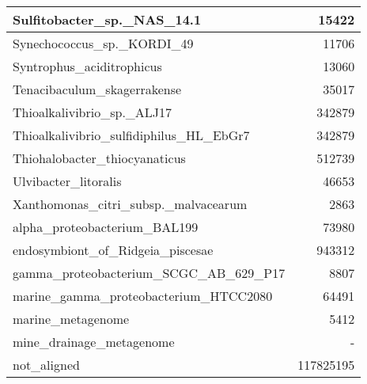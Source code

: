 \documentclass[12pt,a4paper]{article}
\begin{document}
\begin{table}[ht]
\begin{center}
\begin{tabular}{|l*{1}{|r}|}
Sulfitobacter\_sp.\_NAS\_14.1 & 15422 \\ \hline
Synechococcus\_sp.\_KORDI\_49 & 11706 \\ \hline
Syntrophus\_aciditrophicus & 13060 \\ \hline
Tenacibaculum\_skagerrakense & 35017 \\ \hline
Thioalkalivibrio\_sp.\_ALJ17 & 342879 \\ \hline
Thioalkalivibrio\_sulfidiphilus\_HL\_EbGr7 & 342879 \\ \hline
Thiohalobacter\_thiocyanaticus & 512739 \\ \hline
Ulvibacter\_litoralis & 46653 \\ \hline
Xanthomonas\_citri\_subsp.\_malvacearum & 2863 \\ \hline
alpha\_proteobacterium\_BAL199 & 73980 \\ \hline
endosymbiont\_of\_Ridgeia\_piscesae & 943312 \\ \hline
gamma\_proteobacterium\_SCGC\_AB\_629\_P17 & 8807 \\ \hline
marine\_gamma\_proteobacterium\_HTCC2080 & 64491 \\ \hline
marine\_metagenome & 5412 \\ \hline
mine\_drainage\_metagenome & - \\ \hline
not\_aligned & 117825195 \\ \hline
\end{tabular}
\end{center}
\end{table}
\end{document}
